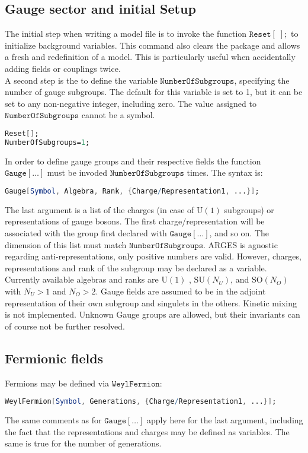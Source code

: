 \documentclass{scrartcl}
\begin{document}
\subsection{Gauge sector and initial Setup}
The initial step when writing a model file is to invoke the function $\mathtt{Reset[\;];}$ to initialize background variables. This command also clears the package and allows a fresh and redefinition of a model. This is particularly useful when accidentally adding fields or couplings twice. \\
A second step is the to define the variable $\mathtt{NumberOfSubgroups}$, specifying the number of gauge subgroups. The default for this variable is set to 1, but it can be set to any non-negative integer, including zero. The value assigned to $\mathtt{NumberOfSubgroups}$ cannot be a symbol.
\vspace{1em}
\begin{lstlisting}[language=mathematica,mathescape,columns=flexible,backgroundcolor=\color{light-gray}]
Reset[];
NumberOfSubgroups=1;
\end{lstlisting}
\vspace{1em}
In order to define gauge groups and their respective fields the function $\mathtt{Gauge[\dots]}$ must be invoded $\mathtt{NumberOfSubgroups}$ times. The syntax is:
\begin{lstlisting}[language=mathematica,mathescape,columns=flexible,backgroundcolor=\color{light-gray}]
Gauge[Symbol, Algebra, Rank, {Charge/Representation1, ...}];
\end{lstlisting}
The last argument is a list of the charges (in case of $\mathrm{U}(1)$ subgroups) or representations of gauge bosons. The first charge/representation will be associated with the group first declared with $\mathtt{Gauge[\dots]}$, and so on. The dimension of this list must match $\mathtt{NumberOfSubgroups}$. ARGES is agnostic regarding anti-representations, only positive numbers are valid. However, charges, representations and rank of the subgroup may be declared as a variable. \newline Currently available algebras and ranks are $\mathrm{U}(1)$ , $\mathrm{SU}(N_U)$, and $\mathrm{SO}(N_O)$ with $N_U > 1$ and $N_O > 2$. Gauge fields are assumed to be in the adjoint representation of their own subgroup and singulets in the others. Kinetic mixing is not implemented. \newline Unknown Gauge groups are allowed, but their invariants can of course not be further resolved.
\subsection{Fermionic fields}
Fermions may be defined via $\mathtt{WeylFermion}$:
\begin{lstlisting}[language=mathematica,mathescape,columns=flexible,backgroundcolor=\color{light-gray}]
WeylFermion[Symbol, Generations, {Charge/Representation1, ...}];
\end{lstlisting}
The same comments as for $\mathtt{Gauge[\dots]}$ apply here for the last argument, including the fact that the representations and charges may be defined as variables. The same is true for the number of generations.
\end{document}
